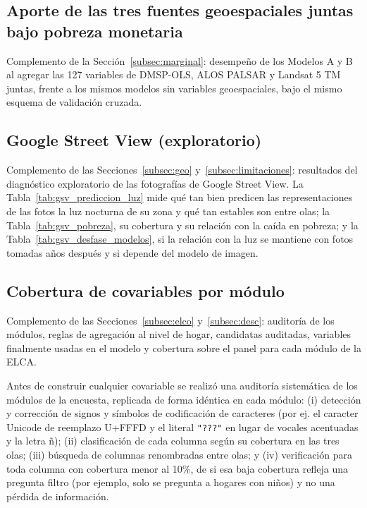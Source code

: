 \documentclass[12pt, letterpaper]{article}
\begin{document}




\subsection{Aporte de las tres fuentes geoespaciales juntas bajo pobreza monetaria}
\label{apx:geo3_cv}

Complemento de la Sección~\ref{subsec:marginal}: desempeño de los Modelos
A y B al agregar las 127 variables de DMSP-OLS, ALOS PALSAR y Landsat 5 TM
juntas, frente a los mismos modelos sin variables geoespaciales, bajo el
mismo esquema de validación cruzada.



\subsection{Google Street View (exploratorio)}
\label{apx:gsv}

Complemento de las Secciones~\ref{subsec:geo} y~\ref{subsec:limitaciones}:
resultados del diagnóstico exploratorio de las fotografías de Google
Street View. La Tabla~\ref{tab:gsv_prediccion_luz} mide qué tan bien
predicen las representaciones de las fotos la luz nocturna de su zona y
qué tan estables son entre olas; la Tabla~\ref{tab:gsv_pobreza}, su
cobertura y su relación con la caída en pobreza; y la
Tabla~\ref{tab:gsv_desfase_modelos}, si la relación con la luz se
mantiene con fotos tomadas años después y si depende del modelo de
imagen.







\subsection{Cobertura de covariables por módulo}
\label{apx:cobertura_modulos}

Complemento de las Secciones~\ref{subsec:elco} y~\ref{subsec:desc}:
auditoría de los módulos, reglas de agregación al nivel de hogar,
candidatas auditadas, variables finalmente usadas en el modelo y
cobertura sobre el panel para cada módulo de la ELCA.

Antes de construir cualquier covariable se realizó una auditoría
sistemática de los módulos de la encuesta, replicada de forma
idéntica en cada módulo: (i) detección y corrección de signos y símbolos de
codificación de caracteres (por ej. el caracter Unicode de reemplazo U+FFFD y el
literal \texttt{"???"} en lugar de vocales acentuadas y la letra ñ);
(ii) clasificación de cada columna según su
cobertura en las tres olas; (iii) búsqueda de columnas renombradas entre
olas; y (iv) verificación para toda columna con cobertura menor
al 10\%, de si esa baja cobertura refleja una pregunta filtro (por
ejemplo, solo se pregunta a hogares con niños) y no una pérdida de
información.
\end{document}
